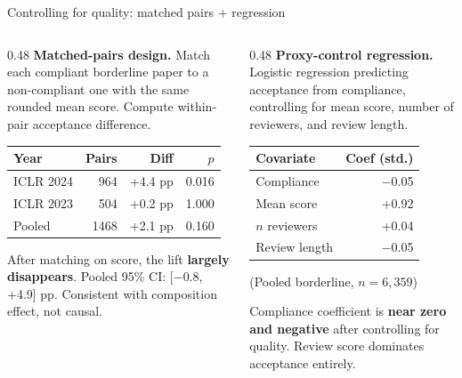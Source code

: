 \documentclass[aspectratio=169,11pt]{beamer}
\begin{document}
\begin{frame}[label=matched]{Controlling for quality: matched pairs + regression}
\begin{columns}[T]
\begin{column}{0.48\textwidth}
{\small \textbf{Matched-pairs design.} Match each compliant borderline paper to a non-compliant one with the same rounded mean score. Compute within-pair acceptance difference.}

\vspace{0.5em}
\centering
{\scriptsize
\begin{tabular}{lrrr}
\toprule
\textbf{Year} & \textbf{Pairs} & \textbf{Diff} & \textbf{$p$} \\
\midrule
ICLR 2024 & 964 & +4.4 pp & 0.016 \\
ICLR 2023 & 504 & +0.2 pp & 1.000 \\
Pooled & 1468 & +2.1 pp & 0.160 \\
\bottomrule
\end{tabular}
}

\vspace{0.5em}
\raggedright
{\small After matching on score, the lift \textbf{largely disappears}. Pooled 95\% CI: [$-$0.8, +4.9] pp. Consistent with composition effect, not causal.}
\end{column}
\begin{column}{0.48\textwidth}
{\small \textbf{Proxy-control regression.} Logistic regression predicting acceptance from compliance, controlling for mean score, number of reviewers, and review length.}

\vspace{0.5em}
\centering
{\scriptsize
\begin{tabular}{lr}
\toprule
\textbf{Covariate} & \textbf{Coef (std.)} \\
\midrule
Compliance & $-$0.05 \\
Mean score & +0.92 \\
$n$ reviewers & +0.04 \\
Review length & $-$0.05 \\
\bottomrule
\end{tabular}
}

\vspace{0.2em}
{\scriptsize (Pooled borderline, $n = 6{,}359$)}

\vspace{0.5em}
\raggedright
{\small Compliance coefficient is \textbf{near zero and negative} after controlling for quality. Review score dominates acceptance entirely.}
\end{column}
\end{columns}
\end{frame}
\end{document}
